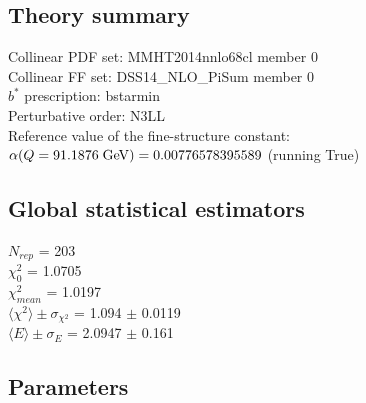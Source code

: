 \documentclass[
]{article}
\begin{document}
\hypertarget{theory-summary}{%
\subsection{Theory summary}\label{theory-summary}}

Collinear PDF set: MMHT2014nnlo68cl member 0\\
Collinear FF set: DSS14\_NLO\_PiSum member 0\\
\(b^*\) prescription: bstarmin\\
Perturbative order: N3LL\\
Reference value of the fine-structure constant:
\(\alpha(Q = 91.1876\;{\rm GeV}) = 0.00776578395589\) (running True)

\hypertarget{global-statistical-estimators}{%
\subsection{Global statistical
estimators}\label{global-statistical-estimators}}

\(N_{rep}\) = 203\\
\(\chi_{0}^2\) = 1.0705\\
\(\chi_{mean}^2\) = 1.0197\\
\(\langle\chi^2\rangle \pm \sigma_{\chi^2}\) = 1.094 \(\pm\) 0.0119\\
\(\langle E \rangle \pm \sigma_{E}\) = 2.0947 \(\pm\) 0.161

\hypertarget{parameters}{%
\subsection{Parameters}\label{parameters}}
\end{document}
